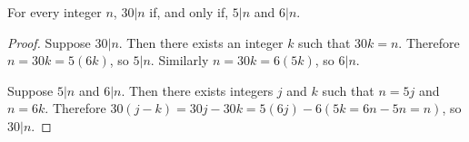
\begin{theorem}
  For every integer $n$, $30|n$ if, and only if, $5|n$ and $6|n$.
\end{theorem}

\begin{proof}
  Suppose $30|n$. Then there exists an integer $k$ such that $30k=n$. Therefore
  $n=30k=5(6k)$, so $5|n$. Similarly $n=30k=6(5k)$, so $6|n$.

  Suppose $5|n$ and $6|n$. Then there exists integers $j$ and $k$ such that $n=5j$
  and $n=6k$. Therefore $30(j-k)=30j-30k=5(6j)-6(5k=6n-5n=n)$, so $30|n$.
\end{proof}
